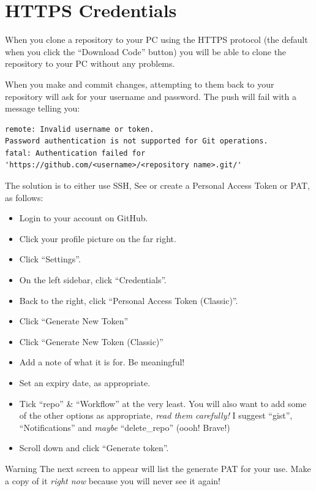 \chapter{HTTPS Credentials}\label{chap: Http Credentials}

When you clone a repository to your PC using the HTTPS protocol (the default when you click the ``Download Code'' button) you will be able to clone the repository to your PC without any problems.

When you make and commit changes, attempting to  them back to your repository will ask for your username and password. The push will fail with a message telling you:

\begin{lstlisting}
remote: Invalid username or token.
Password authentication is not supported for Git operations.
fatal: Authentication failed for
'https://github.com/<username>/<repository name>.git/'
\end{lstlisting}

The solution is to either use SSH, See  or create a Personal Access Token or PAT, as follows:

\begin{itemize}
    \item Login to your account on GitHub.
    \item Click your profile picture on the far right.
    \item Click ``Settings''.
    \item On the left sidebar, click ``Credentials''.
    \item Back to the right, click ``Personal Access Token (Classic)''.
    \item Click ``Generate New Token''
    \item Click ``Generate New Token (Classic)''
    \item Add a note of what it is for. Be meaningful!
    \item Set an expiry date, as appropriate.
    \item Tick ``repo'' \& ``Workflow'' at the very least. You will also want to add some of the other options as appropriate, \emph{read them carefully!} I suggest ``gist'', ``Notifications'' and \emph{maybe} ``delete\_repo'' (oooh! Brave!)
    \item Scroll down and click ``Generate token''.
\end{itemize}

\begin{tips}{Warning}
    The next screen to appear will list the generate PAT for your use. Make a copy of it \emph{right now} because you will never see it again!
\end{tips}

